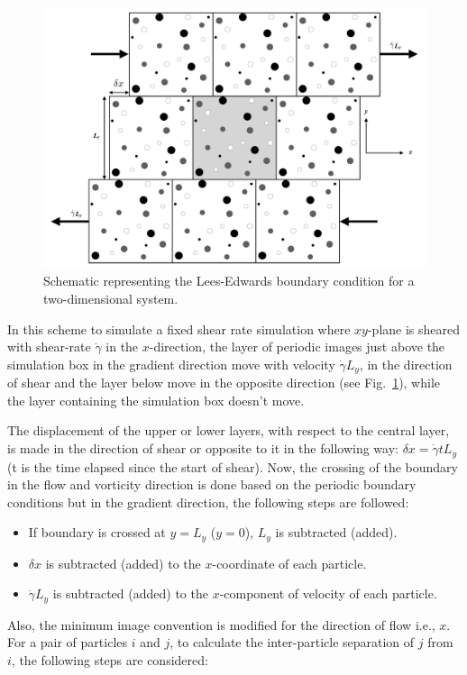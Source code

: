     \begin{figure}[hbt!]
	\includegraphics[width=14cm]{figs/LEpbc.pdf}
	\centering
	\caption[{\em Schematic representing the Lees-Edwards boundary condition}]{Schematic representing the Lees-Edwards boundary condition for a two-dimensional system.\label{LEpbc}}
    \end{figure}
    
    In this scheme to simulate a fixed shear rate simulation where $xy$-plane is sheared with shear-rate $\dot{\gamma}$ in the $x$-direction, the layer of periodic images just above the simulation box in the gradient direction move with velocity $\dot{\gamma}L_y$, in the direction of shear and the layer below move in the opposite direction (see Fig.~\ref{LEpbc}), while the layer containing the simulation box doesn't move.
     
    The displacement of the upper or lower layers, with respect to the central layer,  is made in the direction of shear or opposite to it in the following way: $\delta x = \dot{\gamma} t L_y$ (t is the time elapsed since the start of shear). Now, the crossing of the boundary in the flow and vorticity direction is done based on the periodic boundary conditions but in the gradient direction, the following steps are followed:
    \begin{itemize}
        \item If boundary is crossed at $y = L_y$ ($y = 0$), $L_y$ is subtracted (added).
        \item $\delta x$ is subtracted (added) to the $x$-coordinate of each particle.
        \item $\dot{\gamma}L_y$ is subtracted (added) to the $x$-component of velocity of each particle.
    \end{itemize}
    Also, the minimum image convention is modified for the direction of flow i.e., $x$. For a pair of particles $i$ and $j$, to calculate the inter-particle separation of $j$ from $i$, the following steps are considered:
    
